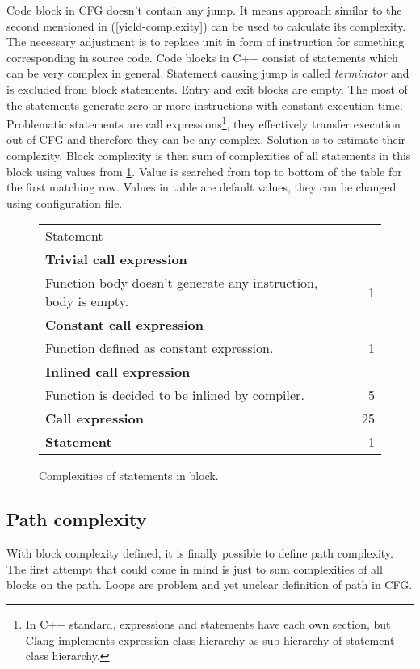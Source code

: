 Code block in CFG doesn't contain any jump. It means approach similar to the second mentioned in (\ref{yield-complexity}) can be used to calculate its complexity. The necessary adjustment is to replace unit in form of instruction for something corresponding in source code. Code blocks in C++ consist of statements which can be very complex in general. Statement causing  jump is called \emph{terminator} and is excluded from block statements. Entry and exit blocks are empty. The most of the statements generate zero or more instructions with constant execution time. Problematic statements are call expressions\footnote{In C++ standard, expressions and statements have each own section, but Clang implements expression class hierarchy as sub-hierarchy of statement class hierarchy.}, they effectively transfer execution out of CFG and therefore they can be any complex. Solution is to estimate their complexity. Block complexity is then sum of complexities of all statements in this block using values from \ref{yield-block}. Value is searched from top to bottom of the table for the first matching row. Values in table are default values, they can be changed using configuration file.

\begin{figure}[h!]
\caption{Complexities of statements in block.}
\label{yield-block}
\vspace{0.5cm}
\renewcommand{\arraystretch}{1.1}
\centering
\begin{tabular}{ l | r }
  \cellcolor[gray]{0.9}Statement & \cellcolor[gray]{0.9} \\
  \textbf{Trivial call expression}\\Function body doesn't generate any instruction, body is empty. & 1 \\
  \textbf{Constant call expression}\\Function defined as constant expression. & 1 \\
  \textbf{Inlined call expression}\\Function is decided to be inlined by compiler. & 5 \\
  \cellcolor[gray]{0.9}\textbf{Call expression} & \cellcolor[gray]{0.9}25 \\
  \cellcolor[gray]{0.9}\textbf{Statement} & \cellcolor[gray]{0.9}1 \\
\end{tabular}
\end{figure}

\subsection{Path complexity}
With block complexity defined, it is finally possible to define path complexity. The first attempt that could come in mind is just to sum complexities of all blocks on the path. Loops are problem and yet unclear definition of path in CFG.


